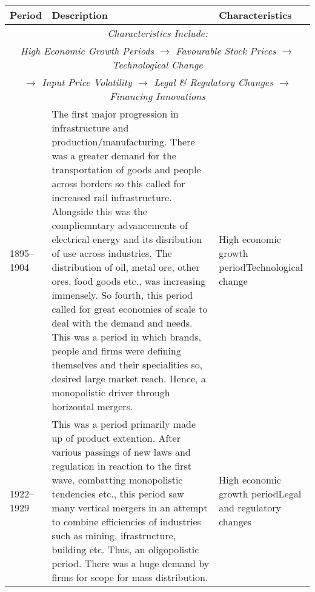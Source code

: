 \documentclass[11pt, english]{article}
\begin{document}
\newpage

\begin{center}
        \scriptsize
\begin{longtable}{p{1.5cm}p{7cm}p{4cm}}
        \textbf{Period} & \textbf{Description} & \textbf{Characteristics}\\
        \hline
        \multicolumn{3}{c}{\textit{Characteristics Include:}}\\
        \multicolumn{3}{c}{\textit{High Economic Growth Periods $\rightarrow$ Favourable Stock Prices $\rightarrow$ Technological Change}}\\ 
        \multicolumn{3}{c}{\textit{$\rightarrow$ Input Price Volatility $\rightarrow$ Legal \& Regulatory Changes $\rightarrow$ Financing Innovations}}\\
        \hline
        1895--1904 & The first major progression in infrastructure and production/manufacturing. There was a greater demand for the transportation of goods and people across borders so this called for increased rail infrastructure. Alongside this was the compliemntary advancements of electrical energy and its disribution of use across industries. The distribution of oil, metal ore, other ores, food  goods etc., was increasing immensely. So fourth, this period called for great economies of scale to deal with the demand and needs. This was a period in which brands, people and firms were defining themselves and their specialities so, desired large market reach. Hence, a monopolistic driver through horizontal mergers. & High economic growth period\newline Technological change\\
        1922--1929 & This was a period primarily made up of product extention. After various passings of new laws and regulation in reaction to the first wave, combatting monopolistic tendencies etc., this period saw many vertical mergers in an attempt to combine efficiencies of industries such as mining, ifrastructure, building etc. Thus, an oligopolistic period. There was a huge demand by firms for scope for mass distribution. & High economic growth period\newline Legal and regulatory changes\\

\end{longtable}
\end{center}
\end{document}
